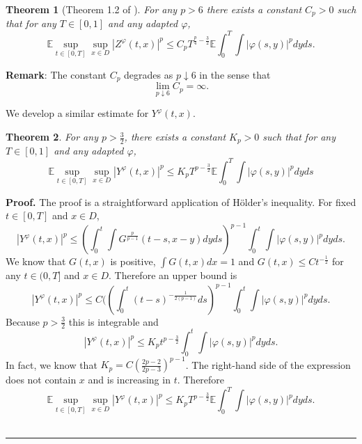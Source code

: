\documentclass[12pt]{article}
\newtheorem{theorem}{Theorem}
\newenvironment{proof}[1][Proof]{\noindent\textbf{#1.} }{\ \rule{0.5em}{0.5em}}
\numberwithin{equation}{section}
\begin{document}
\begin{theorem}[Theorem 1.2 of \cite{salins2025}] \label{thm:stoch}
	For any $p>6$ there exists a constant $C_p>0$ such that for any $T \in [0,1]$ and any adapted $\varphi$,
	\begin{equation}
		\mathbb{E} \sup_{t \in [0,T]} \sup_{x \in D} |Z^{\varphi}(t,x)|^p \leq C_p T^{\frac{p}{4} - \frac{3}{2}} \mathbb{E}\int_0^T \int |\varphi(s,y)|^pdyds.
	\end{equation}
\end{theorem}
\textbf{Remark}: The constant $C_p$ degrades as $p \downarrow 6$ in the sense that
	\[\lim_{p \downarrow 6} C_p = \infty.\]


We develop a similar estimate for $Y^{\varphi}(t,x)$.
\begin{theorem} \label{thm:Leb}
	For any $p>\frac{3}{2}$, there exists a constant $K_p>0$ such that for any $T\in [0,1]$ and any adapted $\varphi$,
	\begin{equation}
		\mathbb{E} \sup_{t \in [0,T]} \sup_{x \in D} |Y^{\varphi}(t,x)|^p \leq K_p T^{p-\frac{3}{2}} \mathbb{E}\int_0^T \int |\varphi(s,y)|^pdyds
	\end{equation}
\end{theorem}

\begin{proof}
	The proof is a straightforward application of H\"older's inequality. For fixed $t \in [0,T]$ and $x \in D$,
	\begin{equation}
		|Y^{\varphi}(t,x)|^p \leq \left(\int_0^t\int G^{\frac{p}{p-1}}(t-s,x-y)dyds\right)^{p-1}\int_0^t \int |\varphi(s,y)|^pdyds.
	\end{equation}
	We know that $G(t,x)$ is positive, $\int G(t,x)dx =1$ and $G(t,x)\leq Ct^{-\frac{1}{2}}$ for any $t\in(0,T]$ and $x\in D$. Therefore an upper bound is
	\begin{equation}
		|Y^{\varphi}(t,x)|^p \leq C(\left(\int_0^t (t-s)^{-\frac{1}{2(p-1)}}ds\right)^{p-1}\int_0^t \int |\varphi(s,y)|^pdyds.
	\end{equation}
	Because $p>\frac{3}{2}$ this is integrable and
	\begin{equation}
		|Y^{\varphi}(t,x)|^p \leq K_p t^{p-\frac{3}{2}}\int_0^t \int |\varphi(s,y)|^pdyds.
	\end{equation}
	In fact, we know that $K_p = C\left(\frac{2p-2}{2p-3}\right)^{p-1}$.
	The right-hand side of the expression does not contain $x$ and is increasing in $t$. Therefore
	\begin{equation}
		\mathbb{E} \sup_{t \in [0,T]} \sup_{x \in D} |Y^{\varphi}(t,x)|^p \leq K_p T^{p-\frac{3}{2}} \mathbb{E} \int_0^T \int |\varphi(s,y)|^pdyds.
	\end{equation}
\end{proof}
\end{document}
